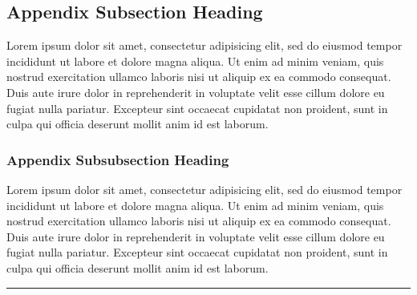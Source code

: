 \documentclass[11pt]{penrose}
\begin{document}
\subsection{Appendix Subsection Heading}
Lorem ipsum dolor sit amet, consectetur adipisicing elit, sed do eiusmod tempor
incididunt ut labore et dolore magna aliqua. Ut enim ad minim veniam, quis nostrud
exercitation ullamco laboris nisi ut aliquip ex ea commodo consequat. Duis aute irure
dolor in reprehenderit in voluptate velit esse cillum dolore eu fugiat nulla pariatur.
Excepteur sint occaecat cupidatat non proident, sunt in culpa qui officia deserunt mollit
anim id est laborum.

\subsubsection{Appendix Subsubsection Heading}
Lorem ipsum dolor sit amet, consectetur adipisicing elit, sed do eiusmod tempor
incididunt ut labore et dolore magna aliqua. Ut enim ad minim veniam, quis nostrud
exercitation ullamco laboris nisi ut aliquip ex ea commodo consequat. Duis aute irure
dolor in reprehenderit in voluptate velit esse cillum dolore eu fugiat nulla pariatur.
Excepteur sint occaecat cupidatat non proident, sunt in culpa qui officia deserunt mollit
anim id est laborum.

\begin{center}
  \vspace*{0.5em}
  \rule{0.8\textwidth}{0.8pt}
\end{center}

\nocite{*}
{\small }
\end{document}

